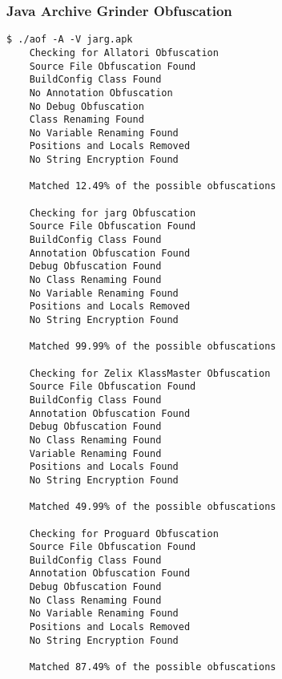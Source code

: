 \subsubsection{Java Archive Grinder Obfuscation}
\label{app:jargob}
\begin{lstlisting}
$ ./aof -A -V jarg.apk
    Checking for Allatori Obfuscation
	Source File Obfuscation Found
	BuildConfig Class Found
	No Annotation Obfuscation
	No Debug Obfuscation
	Class Renaming Found
	No Variable Renaming Found
	Positions and Locals Removed
	No String Encryption Found

	Matched 12.49% of the possible obfuscations

    Checking for jarg Obfuscation
	Source File Obfuscation Found
	BuildConfig Class Found
	Annotation Obfuscation Found
	Debug Obfuscation Found
	No Class Renaming Found
	No Variable Renaming Found
	Positions and Locals Removed
	No String Encryption Found

	Matched 99.99% of the possible obfuscations

    Checking for Zelix KlassMaster Obfuscation
	Source File Obfuscation Found
	BuildConfig Class Found
	Annotation Obfuscation Found
	Debug Obfuscation Found
	No Class Renaming Found
	Variable Renaming Found
	Positions and Locals Found
	No String Encryption Found

	Matched 49.99% of the possible obfuscations

    Checking for Proguard Obfuscation
	Source File Obfuscation Found
	BuildConfig Class Found
	Annotation Obfuscation Found
	Debug Obfuscation Found
	No Class Renaming Found
	No Variable Renaming Found
	Positions and Locals Removed
	No String Encryption Found

	Matched 87.49% of the possible obfuscations
\end{lstlisting}
\newpage
